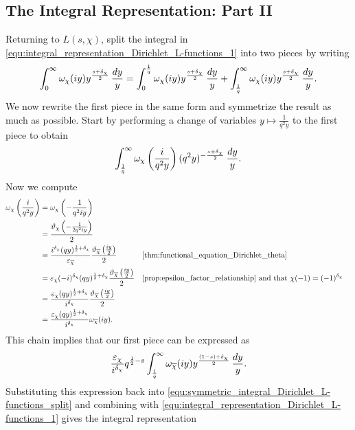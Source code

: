     \subsection*{The Integral Representation: Part II}
      Returning to $L(s,\chi)$, split the integral in \cref{equ:integral_representation_Dirichlet_L-functions_1} into two pieces by writing
      \begin{equation}\label{equ:symmetric_integral_Dirichlet_L-functions_split}
        \int_{0}^{\infty}\omega_{\chi}(iy)y^{\frac{s+\delta_{\chi}}{2}}\,\frac{dy}{y} = \int_{0}^{\frac{1}{q}}\omega_{\chi}(iy)y^{\frac{s+\delta_{\chi}}{2}}\,\frac{dy}{y}+\int_{\frac{1}{q}}^{\infty}\omega_{\chi}(iy)y^{\frac{s+\delta_{\chi}}{2}}\,\frac{dy}{y}.
      \end{equation}
      We now rewrite the first piece in the same form and symmetrize the result as much as possible. Start by performing a change of variables $y \mapsto \frac{1}{q^{2}y}$ to the first piece to obtain
      \[
        \int_{\frac{1}{q}}^{\infty}\omega_{\chi}\left(\frac{i}{q^{2}y}\right)(q^{2}y)^{-\frac{s+\delta_{\chi}}{2}}\,\frac{dy}{y}.
      \]
      Now we compute
      \begin{align*}
        \w_{\chi}\left(\frac{i}{q^{2}y}\right) &= \w_{\chi}\left(-\frac{1}{q^{2}iy}\right) \\
        &= \frac{\vt_{\chi}\left(-\frac{1}{2q^{2}iy}\right)}{2} \\
        &= \frac{i^{\d_{\chi}}(qy)^{\frac{1}{2}+\d_{\chi}}}{\e_{\cchi}}\frac{\vt_{\cchi}\left(\frac{iy}{2}\right)}{2} && \text{\cref{thm:functional_equation_Dirichlet_theta}} \\
        &= \e_{\chi}(-i)^{\d_{\chi}}(qy)^{\frac{1}{2}+\d_{\chi}}\frac{\vt_{\cchi}\left(\frac{iy}{2}\right)}{2} && \text{\cref{prop:epsilon_factor_relationship} and that $\chi(-1) = (-1)^{\d_{\chi}}$} \\
        &= \frac{\e_{\chi}(qy)^{\frac{1}{2}+\d_{\chi}}}{i^{\d_{\chi}}}\frac{\vt_{\cchi}\left(\frac{iy}{2}\right)}{2} \\
        &= \frac{\e_{\chi}(qy)^{\frac{1}{2}+\d_{\chi}}}{i^{\d_{\chi}}}\w_{\cchi}(iy).
      \end{align*}
      This chain implies that our first piece can be expressed as
      \[
        \frac{\varepsilon_{\chi}}{i^{\delta_{\chi}}}q^{\frac{1}{2}-s}\int_{\frac{1}{q}}^{\infty}\omega_{\overline{\chi}}(iy)y^{\frac{(1-s)+\delta_{\chi}}{2}}\,\frac{dy}{y}.
      \]
      Substituting this expression back into \cref{equ:symmetric_integral_Dirichlet_L-functions_split} and combining with \cref{equ:integral_representation_Dirichlet_L-functions_1} gives the integral representation
